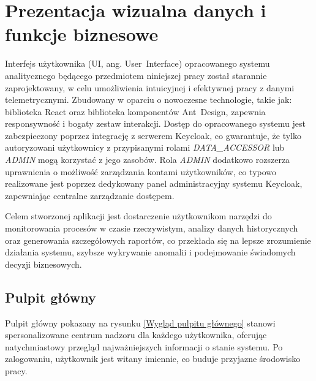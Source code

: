 \section{Prezentacja wizualna danych i funkcje biznesowe}
\label{chap:prezentacja_wizualna}

Interfejs użytkownika (UI, ang. \mbox{User Interface}) opracowanego systemu analitycznego będącego przedmiotem niniejszej pracy został starannie zaprojektowany, w celu umożliwienia intuicyjnej i efektywnej pracy z danymi telemetrycznymi. Zbudowany w oparciu o nowoczesne technologie, takie jak: biblioteka React oraz biblioteka komponentów \mbox{Ant Design}, zapewnia responsywność i bogaty zestaw interakcji. Dostęp do opracowanego systemu jest zabezpieczony poprzez integrację z serwerem Keycloak, co gwarantuje, że tylko autoryzowani użytkownicy z przypisanymi rolami \textit{DATA\_ACCESSOR} lub \textit{ADMIN} mogą korzystać z jego zasobów. Rola \textit{ADMIN} dodatkowo rozszerza uprawnienia o możliwość zarządzania kontami użytkowników, co typowo realizowane jest poprzez dedykowany panel administracyjny systemu Keycloak, zapewniając centralne zarządzanie dostępem.

Celem stworzonej aplikacji jest dostarczenie użytkownikom narzędzi do monitorowania procesów w czasie rzeczywistym, analizy danych historycznych oraz generowania szczegółowych raportów, co przekłada się na lepsze zrozumienie działania systemu, szybsze wykrywanie anomalii i podejmowanie świadomych decyzji biznesowych.

\subsection{Pulpit główny}

Pulpit główny pokazany na rysunku \ref{Wygląd pulpitu głównego} stanowi spersonalizowane centrum nadzoru dla każdego użytkownika, oferując natychmiastowy przegląd najważniejszych informacji o stanie systemu. Po zalogowaniu, użytkownik jest witany imiennie, co buduje przyjazne środowisko pracy.


